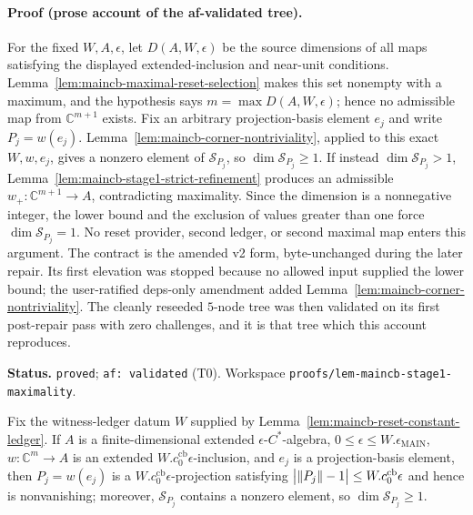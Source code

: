 \paragraph{Proof (prose account of the af-validated tree).}
For the fixed $W,A,\epsilon$, let $D(A,W,\epsilon)$ be the source dimensions of all maps satisfying
the displayed extended-inclusion and near-unit conditions.  Lemma~\ref{lem:maincb-maximal-reset-selection}
makes this set nonempty with a maximum, and the hypothesis says $m=\max D(A,W,\epsilon)$;
hence no admissible map from $\mathbb C^{m+1}$ exists.  Fix an arbitrary projection-basis element
$e_j$ and write $P_j=w(e_j)$.  Lemma~\ref{lem:maincb-corner-nontriviality}, applied to this exact
$W,w,e_j$, gives a nonzero element of $\mathcal S_{P_j}$, so $\dim\mathcal S_{P_j}\geq1$.  If instead
$\dim\mathcal S_{P_j}>1$, Lemma~\ref{lem:maincb-stage1-strict-refinement} produces an admissible
$w_+:\mathbb C^{m+1}\to A$, contradicting maximality.  Since the dimension is a nonnegative integer,
the lower bound and the exclusion of values greater than one force $\dim\mathcal S_{P_j}=1$.
No reset provider, second ledger, or second maximal map enters this argument.
The contract is the amended v2 form, byte-unchanged during the later repair.  Its first elevation
was stopped because no allowed input supplied the lower bound; the user-ratified deps-only amendment
added Lemma~\ref{lem:maincb-corner-nontriviality}.  The cleanly reseeded $5$-node tree was then
validated on its first post-repair pass with zero challenges, and it is that tree which this account
reproduces.

\medskip\noindent\textbf{Status.} \texttt{proved}; \texttt{af: validated} (T0).  Workspace
\texttt{proofs/lem-maincb-stage1-maximality}.

\begin{lemma}\label{lem:maincb-corner-nontriviality}
Fix the witness-ledger datum $W$ supplied by Lemma~\ref{lem:maincb-reset-constant-ledger}.  If $A$
is a finite-dimensional extended $\epsilon$-$C^*$-algebra,
$0\leq\epsilon\leq W.\epsilon_{\mathrm{MAIN}}$, $w:\mathbb C^m\to A$ is an extended
$W.c^{\mathrm{cb}}_0\epsilon$-inclusion, and $e_j$ is a projection-basis element, then
$P_j=w(e_j)$ is a $W.c^{\mathrm{cb}}_0\epsilon$-projection satisfying
$\bigl|\lVert P_j\rVert-1\bigr|\leq W.c^{\mathrm{cb}}_0\epsilon$ and hence is nonvanishing; moreover,
$\mathcal S_{P_j}$ contains a nonzero element, so $\dim\mathcal S_{P_j}\geq1$.
\end{lemma}

